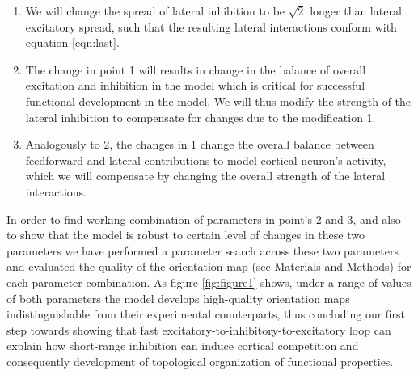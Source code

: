 \documentclass[utf8]{frontiersSCNS}
\begin{document}
\begin{enumerate}

\item We will change the spread of lateral inhibition to be $\sqrt{2}$ longer than lateral excitatory spread, such that the resulting lateral
interactions conform with equation \ref{eqn:last}.

\item The change in point 1 will results in change in the balance of overall excitation and inhibition in the model which is critical 
for successful functional development in the model. We will thus modify the strength of the lateral inhibition to compensate for changes due to the modification 1.

\item Analogously to 2, the changes in 1 change the overall balance between feedforward and lateral contributions to model cortical neuron's activity, 
which we will compensate by changing the overall strength of the lateral interactions.

\end{enumerate} 

In order to find working combination of parameters in point's 2 and 3, and also to show that the model is robust to certain level of changes
in these two parameters we have performed a parameter search across these two parameters and evaluated the quality of the orientation map (see Materials and Methods) for each 
parameter combination. As figure \ref{fig:figure1} shows, under a range of values of both parameters the model develops high-quality orientation maps indistinguishable
from their experimental counterparts, thus concluding our first step towards showing that fast excitatory-to-inhibitory-to-excitatory loop can explain 
how short-range inhibition can induce cortical competition and consequently development of topological organization of functional properties.
\end{document}
